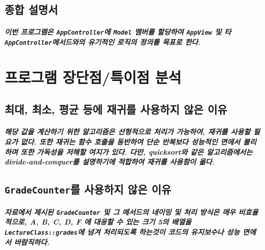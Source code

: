 \documentclass[UTF8]{report}
\begin{document}
        \section{종합 설명서}

            \paragraph{%
                \normalfont 이번 프로그램은 \texttt{AppController}에 \texttt{Model} 멤버를 할당하여 \texttt{AppView} 및 타 \texttt{AppController}메서드와의 유기적인 로직의 정의를 목표로 한다. 
            }
            
    \chapter{프로그램 장단점/특이점 분석}
            \section{최대, 최소, 평균 등에 재귀를 사용하지 않은 이유}
            \paragraph{%
                \normalfont 해당 값을 계산하기 위한 알고리즘은 선형적으로 처리가 가능하여, 재귀를 사용할 필요가 없다. 또한 재귀는 함수 호출을 동반하여 단순 반복보다 성능적인 면에서 불리하며 또한 가독성을 저해할 여지가 있다. 다만, quicksort와 같은 알고리즘에서는 divide-and-conquer를 설명하기에 적합하여 재귀를 사용함이 옮다.
            }   

            \section{\texttt{GradeCounter}를 사용하지 않은 이유}
            \paragraph{%
                \normalfont 자료에서 제시된 \texttt{GradeCounter} 및 그 메서드의 네이밍 및 처리 방식은 매우 비효율적으로, A, B, C, D, F 에 대응할 수 있는 크기 5의 배열을 \texttt{LectureClass::grades}에 넘겨 처리되도록 하는것이 코드의 유지보수나 성능 면에서 바람직하다.
            }
\end{document}
